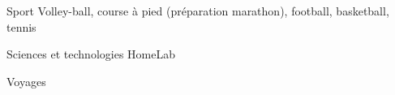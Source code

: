 

\begin{cvskills}

  \cvskill
    {Sport} %
    {Volley-ball, course à pied (préparation marathon), football, basketball, tennis} %

\cvskill
{Sciences et technologies} %
{HomeLab} %

\cvskill
{Voyages} %
{} %


\end{cvskills}
